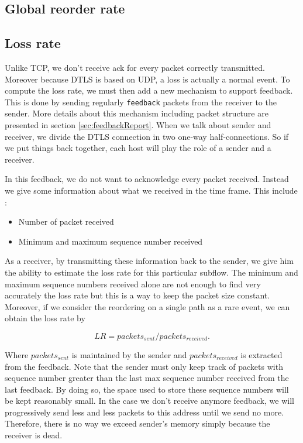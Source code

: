 \documentclass[11pt,a4paper,oldfontcommands]{memoir}
\begin{document}
\subsection{Global reorder rate}


\subsection{Loss rate}

Unlike TCP, we don't receive ack for every packet correctly transmitted. Moreover because DTLS is based on UDP, a loss is actually a normal event. To compute the loss rate, we must then add a new mechanism to support feedback. This is done by sending regularly \verb!feedback! packets from the receiver to the sender. More details about this mechanism including packet structure are presented in section \ref{sec:feedbackReport}. When we talk about sender and receiver, we divide the DTLS connection in two one-way half-connections. So if we put things back together, each host will play the role of a sender and a receiver.

In this feedback, we do not want to acknowledge every packet received. Instead we give some information about what we received in the time frame. This include : 

\begin{itemize}
\item Number of packet received
\item Minimum and maximum sequence number received
\end{itemize}

As a receiver, by transmitting these information back to the sender, we give him the ability to estimate the loss rate for this particular subflow. The minimum and maximum sequence numbers received alone are not enough to find very accurately the loss rate but this is a way to keep the packet size constant. Moreover, if we consider the reordering on a single path as a rare event, we can obtain the loss rate by 

\begin{equation*}
LR = packets_{sent} / packets_{received}.
\end{equation*}

Where $packets_{sent}$ is maintained by the sender and $packets_{received}$ is extracted from the feedback. Note that the sender must only keep track of packets with sequence number greater than the last max sequence number received from the last feedback. By doing so, the space used to store these sequence numbers will be kept reasonably small. In the case we don't receive anymore feedback, we will progressively send less and less packets to this address until we send no more. Therefore, there is no way we exceed sender's memory simply because the receiver is dead.
\end{document}
